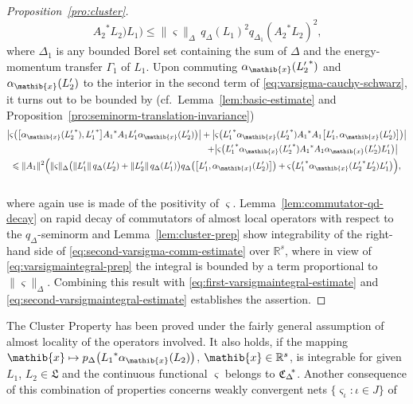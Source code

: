 \documentclass[a4paper,a4paper]{article}
\numberwithin{equation}{section}
\newcommand{\Lfrak}{\mathfrak{L}}
\newcommand{\xib}{\mathib{x}}
\newcommand{\Rs}{\mathbb{R}^s}
\newcommand{\CDstar}{{\mathfrak{C}_\Delta}^{\negthickspace *}}
\newcommand{\aibx}{\alpha_\mathib{x}}
\theoremstyle{definition}
\theoremstyle{plain}
\theoremstyle{remark}
\newcommand{\bset}[1]{\bigl\{ #1 \bigr\}}
\newcommand{\bcomm}[2]{\bigl[ #1 , #2 \bigr]}
\newcommand{\babs}[1]{\bigl\lvert #1 \bigr\rvert}
\newcommand{\norm}[1]{\lVert #1 \rVert}
\newcommand{\bpDx}[1]{p_\Delta \bigl( #1 \bigr)}
\newcommand{\qD}{q_\Delta}
\newcommand{\qDx}[1]{q_\Delta ( #1 )}
\newcommand{\bqDx}[1]{q_\Delta \bigl( #1 \bigr)}
\begin{document}
\begin{proof}[Proposition~\ref{pro:cluster}]
\begin{equation}
      {A_2}^* L_2 ) L_1 \bigr) \leqslant \norm{\varsigma}_\Delta \, 
      \qDx{L_1}^2 q_{\Delta_1} ( {A_2}^* L_2 )^2 \text{,}
    \end{equation}
    where $\Delta_1$ is any bounded Borel set containing the sum of
    $\Delta$ and the energy-momentum transfer $\Gamma_1$ of $L_1$.
    Upon commuting $\aibx ( {L'_2}^* )$ and $\aibx ( L'_2 )$ to the
    interior in the second term of \eqref{eq:varsigma-cauchy-schwarz},
    it turns out to be bounded by (cf.~Lemma~\ref{lem:basic-estimate}
    and Proposition~\ref{pro:seminorm-translation-invariance})
    \begin{multline}
      \label{eq:second-varsigma-comm-estimate}
      \babs{\varsigma \bigl( \bcomm{\aibx ( {L'_2}^* )}{{L'_1}^*}
      {A_1}^* A_1 L'_1 \aibx ( L'_2 ) \bigr)} + \babs{\varsigma \bigl(
      {L'_1}^* \aibx ( {L'_2}^* ) {A_1}^* A_1 \bcomm{L'_1}{\aibx (
      L'_2 )} \bigr)} \\ 
      \shoveright{+ \babs{\varsigma \bigl( {L'_1}^* \aibx ( {L'_2}^* )
      {A_1}^* A_1 \aibx ( L'_2 ) L'_1 \bigr)}} \\
      \leqslant \norm{A_1}^2 \Bigl( \norm{\varsigma}_\Delta \bigl(
      \norm{L'_1} \, \qDx{L'_2} + \norm{L'_2} \, \qDx{L'_1} \bigr)
      \bqDx{\bcomm{L'_1}{\aibx ( L'_2 )}} + \varsigma \bigl( {L'_1}^*
      \aibx ( {L'_2}^* L'_2 ) L'_1 \bigr) \Bigr) \text{,} \\
      ~
    \end{multline}
    where again use is made of the positivity of $\varsigma$.
    Lemma~\ref{lem:commutator-qd-decay} on rapid decay of commutators
    of almost local operators with respect to the $\qD$-seminorm and
    Lemma~\ref{lem:cluster-prep} show integrability of the right-hand
    side of \eqref{eq:second-varsigma-comm-estimate} over $\Rs$, where
    in view of \eqref{eq:varsigmaintegral-prep} the integral is
    bounded by a term proportional to $\norm{\varsigma}_\Delta$.
    Combining this result with
    \eqref{eq:first-varsigmaintegral-estimate} and
    \eqref{eq:second-varsigmaintegral-estimate} establishes the
    assertion.
  \end{proof}
  The Cluster Property has been proved under the fairly general
  assumption of almost locality of the operators involved. It also
  holds, if the mapping $\xib \mapsto \bpDx{{L_1}^* \aibx ( L_2 )}$,
  $\xib \in \Rs$, is integrable for given $L_1$, $L_2 \in \Lfrak$ and
  the continuous functional $\varsigma$ belongs to $\CDstar$.  Another
  consequence of this combination of properties concerns weakly
  convergent nets $\bset{\varsigma_\iota : \iota \in J}$ of
\end{document}
